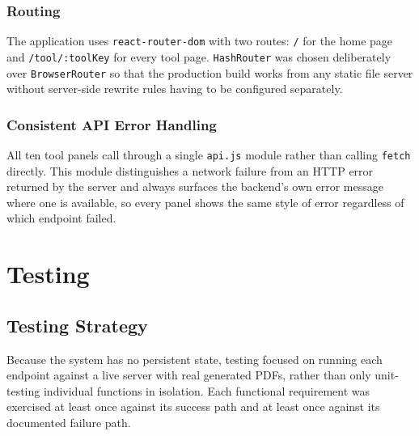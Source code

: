 \documentclass[12pt,a4paper]{report}
\begin{document}
\subsection{Routing}
The application uses \texttt{react-router-dom} with two routes: \texttt{/} for the home page and
\texttt{/tool/:toolKey} for every tool page. \texttt{HashRouter} was chosen deliberately over
\texttt{BrowserRouter} so that the production build works from any static file server without
server-side rewrite rules having to be configured separately.

\subsection{Consistent API Error Handling}
All ten tool panels call through a single \texttt{api.js} module rather than calling
\texttt{fetch} directly. This module distinguishes a network failure from an HTTP error returned
by the server and always surfaces the backend's own error message where one is available, so
every panel shows the same style of error regardless of which endpoint failed.

\chapter{Testing}

\section{Testing Strategy}
Because the system has no persistent state, testing focused on running each endpoint against a
live server with real generated PDFs, rather than only unit-testing individual functions in
isolation. Each functional requirement was exercised at least once against its success path and
at least once against its documented failure path.
\end{document}
